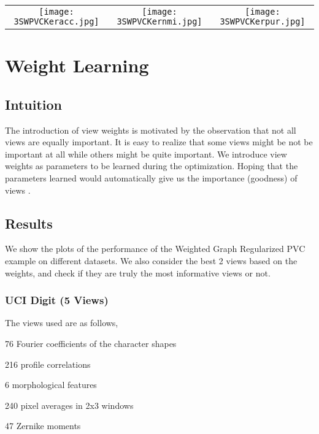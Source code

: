 \documentclass[a4paper]{article}
\begin{document}
	\begin{tabular}[H]{ccc}
		{\texttt{[image: 3SWPVCKeracc.jpg]}} 
    	& {\texttt{[image: 3SWPVCKernmi.jpg]}}
    	& {\texttt{[image: 3SWPVCKerpur.jpg]}}
	\end{tabular}
	\vspace{5mm}

	\restoregeometry	


	\section{Weight Learning}
	
	\subsection{Intuition}
		
	The introduction of view weights is motivated by the observation that not all views are equally important. It is easy to realize that some views might be not be important at all while others might be quite important. We introduce view weights as parameters to be learned during the optimization. Hoping that the parameters learned would automatically give us the importance (goodness) of views \cite{cai2013multi}.

	\subsection{Results}

	We show the plots of the performance of the Weighted Graph Regularized PVC example on different datasets. We also consider the best 2 views based on the weights, and check if they are truly the most informative views or not.	
	
	\subsubsection{UCI Digit (5 Views)}

	The views used are as follows,
	\vspace{-0.2cm}
	\begin{enumerate}[(A)]
	\setlength\itemsep{-0.05em}
	{
		\item 76 Fourier coefficients of the character shapes
		\item 216 profile correlations
		\item 6 morphological features
		\item 240 pixel averages in 2x3 windows 
		\item 47 Zernike moments
	}\end{enumerate}		
\end{document}
